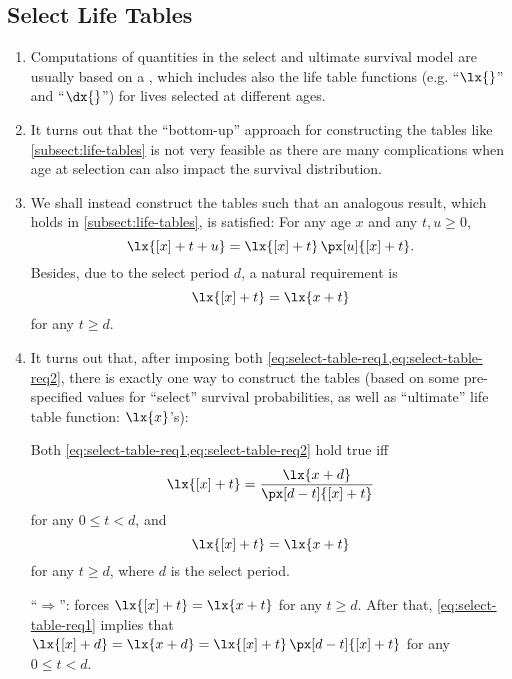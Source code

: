\subsection{Select Life Tables}
\begin{enumerate}
\item Computations of quantities in the select and ultimate survival model are
usually based on a , which includes also the life table
functions (e.g. ``\(\lx{}\)'' and ``\(\dx{}\)'') for lives selected at
different ages.
\item It turns out that the ``bottom-up'' approach for constructing the tables
like \cref{subsect:life-tables} is not very feasible as there are many
complications when age at selection can also impact the survival distribution.
\item We shall instead construct the tables such that an analogous result,
which holds in \cref{subsect:life-tables}, is satisfied: For any age \(x\)
and any \(t,u\ge 0\),
\begin{equation}
\label{eq:select-table-req1}
\lx{[x]+t+u}=\lx{[x]+t}\,\px[u]{[x]+t}.
\end{equation}
Besides, due to the select period \(d\), a natural requirement is
\begin{equation}
\label{eq:select-table-req2}
\lx{[x]+t}=\lx{x+t}
\end{equation}
for any \(t\ge d\).

\item It turns out that, after imposing both
\cref{eq:select-table-req1,eq:select-table-req2}, there is exactly one way to
construct the tables (based on some pre-specified values for ``select''
survival probabilities, as well as ``ultimate'' life table function:
\(\lx{x}\)'s):
\begin{proposition}
Both \cref{eq:select-table-req1,eq:select-table-req2} hold true iff
\[
\lx{[x]+t}=\frac{\lx{x+d}}{\px[d-t]{[x]+t}}
\]
for any \(0\le t< d\), and
\[
\lx{[x]+t}=\lx{x+t}
\]
for any \(t\ge d\), where \(d\) is the select period.
\end{proposition}
\begin{pf}
``\(\Rightarrow\)'':  forces \(\lx{[x]+t}=\lx{x+t}\)
for any \(t\ge d\). After that, \cref{eq:select-table-req1} implies that
\(\lx{[x]+d}=\lx{x+d}=\lx{[x]+t}\,\px[d-t]{[x]+t}\) for any \(0\le t<d\).


\end{pf}
\end{enumerate}

